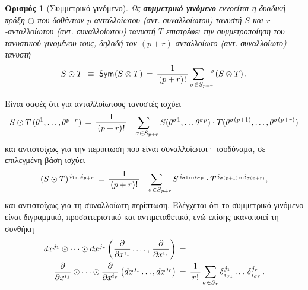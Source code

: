 \documentclass[11pt,a4paper,twoside,openright]{book}
\newtheorem{definition}[lemma]{Ορισμός}
\begin{document}
\begin{definition}[Συμμετρικό γινόμενο]\label{def:symmetric-product}
Ως \textbf{συμμετρικό γινόμενο} εννοείται η δυαδική πράξη
$\odot$ που δοθέντων $p$-ανταλλοίωτου (αντ. συναλλοίωτου) τανυστή $S$ και $r$-ανταλλοίωτου (αντ. συναλλοίωτου) τανυστή $Τ$ επιστρέφει την συμμετροποίηση του τανυστικού γινομένου τους, δηλαδή τον $(p+r)$-ανταλλοίωτο (αντ. συναλλοίωτο) τανυστή
\begin{equation}\label{eq:symmetric-product}
S \odot T
\,\,\equiv\,\,
\textup{\textsf{Sym}}\hspace{.5pt}(S \otimes T)
\,=\,
\frac{1}{\,(p+r)\hspace{.5pt}!\,}
\hspace{-8pt}
\sum_{\,\,\,\,\,\,\sigma \in S_{p+r}}
\hspace{-5pt}
{}^\sigma\hspace{.2pt}(S \otimes T)\,.
\end{equation}
\end{definition}
\noindent
Είναι σαφές ότι για ανταλλοίωτους τανυστές ισχύει
\begin{equation}\label{eq:symmetric-product-analytic}
S \odot T \,(\theta^1, \dots, \theta^{p+r})
\,=\,
\frac{1}{\,(p+r)\hspace{.5pt}!\,}\sum_{\,\,\,\,\,\,\sigma \in S_{p+r}}S(\theta^{\sigma 1}, \dots \theta^{\sigma p}) \cdot T(\theta^{\sigma (p+1)}, \dots, \theta^{\sigma (p+r)})
\end{equation}
και αντιστοίχως για την περίπτωση που είναι συναλλοίωτοι·
ισοδύναμα, σε επιλεγμένη βάση ισχύει
\begin{equation}\label{eq:symmetric-contravariant-quantities}
(S \odot T)^{\,i_1 \dots i_{p+r}}
\,=\,
\frac{1}{\,(p+r)\hspace{.5pt}!\,}\sum_{\,\,\,\,\,\,\sigma \in S_{p+r}}
S^{\,i_{\sigma 1} \dots i_{\sigma p}}
\cdot
T^{\,i_{\sigma (p+1)} \dots i_{\sigma (p+r)}},
\end{equation}
και αντιστοίχως για τη συναλλοίωτη περίπτωση.
Ελέγχεται ότι το συμμετρικό γινόμενο είναι διγραμμικό, προσαιτεριστικό και αντιμεταθετικό, ενώ επίσης ικανοποιεί
τη συνθήκη
\setlength{\jot}{12pt}
\begin{equation}\label{eq:symmetric-product-kronecker}
\begin{split}
dx^{\hspace{.75pt}j_1} \odot \dots \odot dx^{\hspace{.75pt}j_r}
\left(
\frac{\partial}{\partial x^{i_1}}\,,
\dots,\,
\frac{\partial}{\partial x^{i_r}}
\right)
\,&=\,\\
\frac{\partial}{\partial x^{i_1}} \odot \dots \odot \frac{\partial}{\partial x^{i_r}}
\left(
dx^{\hspace{.5pt}j_1}
\dots,
dx^{\hspace{.5pt}j_r}
\right)
\,&=\,
\frac{1}{\,r\hspace{.5pt}!\,}
\sum_{\sigma \in S_r}
\delta_{\hspace{.5pt}i_{\sigma 1}}^{\hspace{.5pt}j_1} \dots\, \delta_{\hspace{.5pt}i_{\sigma r}}^{\hspace{.5pt}j_r}\,.
\end{split}
\end{equation}
\end{document}

